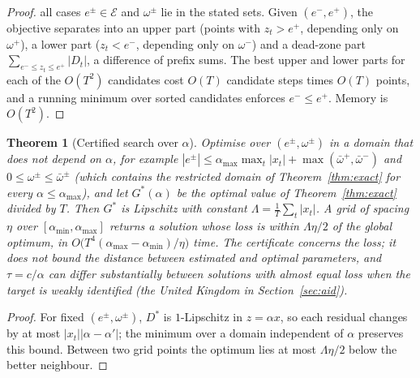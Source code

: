 \documentclass[11pt,a4paper]{article}
\newtheorem{theorem}{Theorem}
\theoremstyle{remark}\newtheorem{remark}{Remark}
\begin{document}
\begin{proof}
all cases $e^\pm\in\mathcal{E}$ and $\omega^\pm$ lie in the stated sets. Given $(e^-,e^+)$, the objective separates into an upper part (points with $z_t>e^+$, depending only on $\omega^+$), a lower part ($z_t<e^-$, depending only on $\omega^-$) and a dead-zone part $\sum_{e^-\le z_t\le e^+}|D_t|$, a difference of prefix sums. The best upper and lower parts for each of the $O(T^2)$ candidates cost $O(T)$ candidate steps times $O(T)$ points, and a running minimum over sorted candidates enforces $e^-\le e^+$. Memory is $O(T^2)$.
\end{proof}

\begin{theorem}[Certified search over $\alpha$]\label{thm:lip}
Optimise over $(e^\pm,\omega^\pm)$ in a domain that does not depend on $\alpha$, for example $|e^\pm|\le\alpha_{\max}\max_t|x_t|+\max(\bar\omega^+,\bar\omega^-)$ and $0\le\omega^\pm\le\bar\omega^\pm$ (which contains the restricted domain of Theorem~\ref{thm:exact} for every $\alpha\le\alpha_{\max}$), and let $G^*(\alpha)$ be the optimal value of Theorem~\ref{thm:exact} divided by $T$. Then $G^*$ is Lipschitz with constant $\Lambda=\frac1T\sum_t|x_t|$. A grid of spacing $\eta$ over $[\alpha_{\min},\alpha_{\max}]$ returns a solution whose loss is within $\Lambda\eta/2$ of the global optimum, in $O\big(T^4(\alpha_{\max}-\alpha_{\min})/\eta\big)$ time. The certificate concerns the loss; it does not bound the distance between estimated and optimal parameters, and $\tau=c/\alpha$ can differ substantially between solutions with almost equal loss when the target is weakly identified (the United Kingdom in Section~\ref{sec:aid}).
\end{theorem}
\begin{proof}
For fixed $(e^\pm,\omega^\pm)$, $D^*$ is $1$-Lipschitz in $z=\alpha x$, so each residual changes by at most $|x_t||\alpha-\alpha'|$; the minimum over a domain independent of $\alpha$ preserves this bound. Between two grid points the optimum lies at most $\Lambda\eta/2$ below the better neighbour.
\end{proof}
\end{document}
